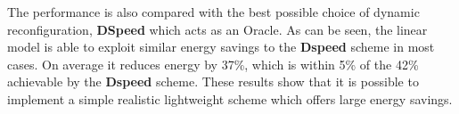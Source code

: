 The performance is also compared with the best possible choice of dynamic reconfiguration, \textbf{DSpeed} which acts as an Oracle.
As can be seen, the linear model is able to exploit similar energy savings to the \textbf{Dspeed} scheme in most cases.
On average it reduces energy by 37\%, which is within 5\% of the 42\% achievable by the \textbf{Dspeed} scheme.
These results show that it is possible to implement a simple realistic lightweight scheme which offers large energy savings.
